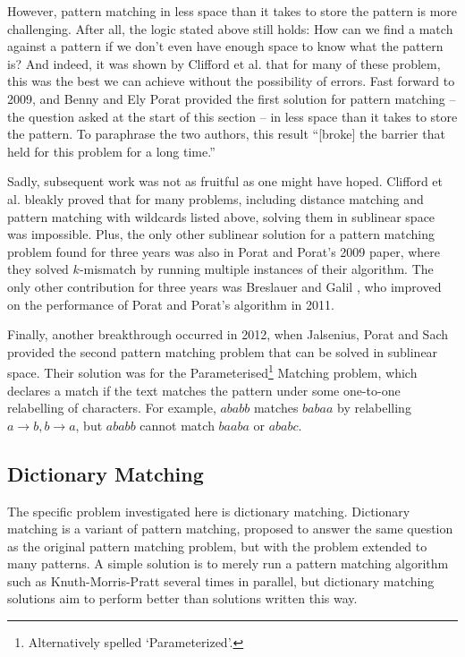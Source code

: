 \documentclass[ %
                    author={Dominic Joseph Moylett},
                    degree={MEng},
                     title={Dictionary Matching with Fingerprints},
                  subtitle={An Empirical Analysis},
                      type={research},
                      year={2015} ]{dissertation}
\begin{document}
However, pattern matching in less space than it takes to store the pattern is more challenging. After all, the logic stated above still holds: How can we find a match against a pattern if we don't even have enough space to know what the pattern is? And indeed, it was shown by Clifford et al. \cite{clifford:black-box} that for many of these problem, this was the best we can achieve without the possibility of errors. Fast forward to 2009, and Benny and Ely Porat \cite{5438620} provided the first solution for pattern matching -- the question asked at the start of this section -- in less space than it takes to store the pattern. To paraphrase the two authors, this result ``[broke] the barrier that held for this problem for a long time.''

Sadly, subsequent work was not as fruitful as one might have hoped. Clifford et al. \cite{DBLP:journals/corr/abs-1106-4412} bleakly proved that for many problems, including distance matching and pattern matching with wildcards listed above, solving them in sublinear space was impossible. Plus, the only other sublinear solution for a pattern matching problem found for three years was also in Porat and Porat's 2009 paper, where they solved $k$-mismatch by running multiple instances of their algorithm. The only other contribution for three years was Breslauer and Galil \cite{Breslauer:2014:RSS:2660854.2635814}, who improved on the performance of Porat and Porat's algorithm in 2011.

Finally, another breakthrough occurred in 2012, when Jalsenius, Porat and Sach \cite{JPS:2013} provided the second pattern matching problem that can be solved in sublinear space. Their solution was for the Parameterised\footnote{Alternatively spelled `Parameterized'.} Matching problem, which declares a match if the text matches the pattern under some one-to-one relabelling of characters. For example, $ababb$ matches $babaa$ by relabelling $a \to b, b \to a$, but $ababb$ cannot match $baaba$ or $ababc$.

\subsection{Dictionary Matching}

The specific problem investigated here is dictionary matching. Dictionary matching is a variant of pattern matching, proposed to answer the same question as the original pattern matching problem, but with the problem extended to many patterns. A simple solution is to merely run a pattern matching algorithm such as Knuth-Morris-Pratt several times in parallel, but dictionary matching solutions aim to perform better than solutions written this way.
\end{document}

